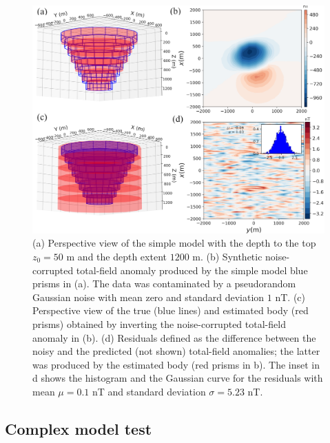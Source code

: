 \documentclass[extra,mreferee]{gji}
\begin{document}
\begin{figure}
    \centering
    \includegraphics[scale=.75]{figures/kimberlite_4figures.png}
    \caption{(a) Perspective view of the simple model with the depth to the top $z_0 = 50$ m and the depth extent $1200$ m. (b) Synthetic noise-corrupted total-field anomaly produced by the simple model blue prisms in (a). The data was contaminated by a pseudorandom Gaussian noise with mean zero and standard deviation $1$ nT. (c) Perspective view of the true (blue lines) and estimated body (red prisms) obtained by inverting the noise-corrupted total-field anomaly in (b). (d) Residuals defined as the difference between the noisy and the predicted (not shown) total-field anomalies; the latter was produced by the estimated body (red prisms in b). The inset in d shows the histogram and the Gaussian curve for the residuals with mean $\mu=0.1$ nT and standard deviation $\sigma=5.23$ nT.
}
    \label{fig:kimb}
\end{figure}

\subsection{Complex model test}
\end{document}
